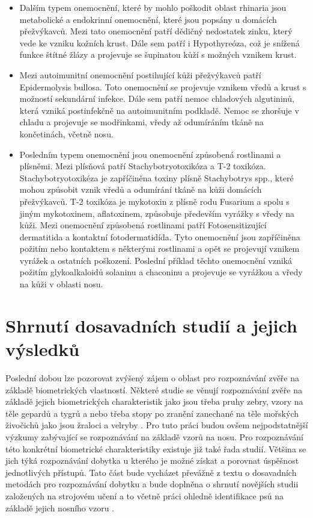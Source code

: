 \begin{itemize}
    \item Dalším typem onemocnění, které by mohlo poškodit oblast rhinaria jsou metabolické a endokrinní onemocnění, které jsou popsány u domácích přežvýkavců. Mezi tato onemocnění patří dědičný nedostatek zinku, který vede ke vzniku kožních krust. Dále sem patří i Hypothyreóza, což je snížená funkce štítné žlázy a projevuje se šupinatou kůží s možných vznikem krust.

    \item Mezi autoimunitní onemocnění postihující kůži přežvýkavců patří Epidermolysis bullosa. Toto onemocnění se projevuje vznikem vředů a krust s možností sekundární infekce. Dále sem patří nemoc chladových algutininů, která vzniká postinfekčně na autoimunitním podkladě. Nemoc se zhoršuje v chladu a projevuje se modřinkami, vředy až odumíráním tkáně na končetinách, včetně nosu.

    \item Posledním typem onemocnění jsou onemocnění způsobená rostlinami a plísněmi. Mezi plísňová patří Stachybotryotoxikóza a T-2 toxikóza. Stachybotryotoxikéza je zapříčiněna toxiny plísně Stachybotrys spp., které mohou způsobit vznik vředů a odumírání tkáně na kůži domácích přežvýkavců. T-2 toxikóza je mykotoxin z plísně rodu Fusarium a spolu s jiným mykotoxinem, aflatoxinem, způsobuje především vyrážky s vředy na kůži. Mezi onemocnění způsobená rostlinami patří Fotosensitizující dermatitida a kontaktní fotodermatidída. Tyto onemocnění jsou zapříčiněna požitím nebo kontaktem s některými rostlinami a opět se projevují vznikem vyrážek a ostatních poškození. Poslední příklad těchto onemocnění vzniká požitím glykoalkaloidů solaninu a chaconinu a projevuje se vyrážkou a vředy na kůži v oblasti nosu.
\end{itemize}


\section{Shrnutí dosavadních studií a jejich výsledků}
\label{Shrnutí dosavadních studií a jejich výsledků}
Poslední dobou lze pozorovat zvýšený zájem o oblast pro rozpoznávání zvěře na základě biometrických vlastností. Některé studie se věnují rozpoznávání zvěře na základě jejich biometrických charakteristik jako jsou třeba pruhy zebry, vzory na těle gepardů a tygrů a nebo třeba stopy po zranění zanechané na těle mořských živočichů jako jsou žraloci a velryby \cite{cattle_recognition_paper}. Pro tuto práci budou ovšem nejpodstatnější výzkumy zabývající se rozpoznávání na základě vzorů na nosu. Pro rozpoznávání této konkrétní biometrické charakteristiky existuje již také řada studií. Většina se jich týká rozpoznávání dobytka u kterého je možné získat a porovnat úspěšnost jednotlivých přístupů. Tato část bude vycházet převážně z textu o dosavadních metodách pro rozpoznávání dobytku \cite{cattle_recognition_paper} a bude doplněna o shrnutí novějších studii založených na strojovém učení \cite{HOSSAIN2022138} a to včetně práci ohledně identifikace psů na základě jejich nosního vzoru \cite{psi}. 


